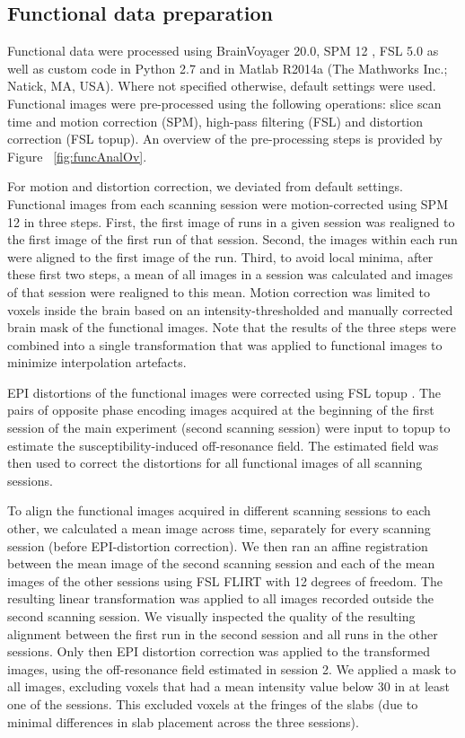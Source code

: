 \subsection{Functional data preparation}
Functional data were processed using BrainVoyager 20.0, SPM 12 \parencite{Friston2006}, FSL 5.0 \parencite{Jenkinson2012} as well as custom code in Python 2.7 \parencite{numpy2011, scipy2001, matplotlib2007} and in Matlab R2014a (The Mathworks Inc.; Natick, MA, USA). Where not specified otherwise, default settings were used. Functional images were pre-processed using the following operations: slice scan time and motion correction (SPM), high-pass filtering (FSL) and distortion correction (FSL topup). An overview of the pre-processing steps is provided by Figure ~\ref{fig:funcAnalOv}.

For motion and distortion correction, we deviated from default settings. Functional images from each scanning session were motion-corrected using SPM 12 in three steps. First, the first image of runs in a given session was realigned to the first image of the first run of that session. Second, the images within each run were aligned to the first image of the run. Third, to avoid local minima, after these first two steps, a mean of all images in a session was calculated and images of that session were realigned to this mean. Motion correction was limited to voxels inside the brain based on an intensity-thresholded and manually corrected brain mask of the functional images. Note that the results of the three steps were combined into a single transformation that was applied to functional images to minimize interpolation artefacts.

EPI distortions of the functional images were corrected using FSL topup \parencite{Andersson2003, Smith2004}. The pairs of opposite phase encoding images acquired at the beginning of the first session of the main experiment (second scanning session) were input to topup to estimate the susceptibility-induced off-resonance field. The estimated field was then used to correct the distortions for all functional images of all scanning sessions.

To align the functional images acquired in different scanning sessions to each other, we calculated a mean image across time, separately for every scanning session (before EPI-distortion correction). We then ran an affine registration between the mean image of the second scanning session and each of the mean images of the other sessions using FSL FLIRT \parencite{Jenkinson2001, Jenkinson2002} with 12 degrees of freedom. The resulting linear transformation was applied to all images recorded outside the second scanning session. We visually inspected the quality of the resulting alignment between the first run in the second session and all runs in the other sessions. Only then EPI distortion correction was applied to the transformed images, using the off-resonance field estimated in session 2. We applied a mask to all images, excluding voxels that had a mean intensity value below 30 in at least one of the sessions. This excluded voxels at the fringes of the slabs (due to minimal differences in slab placement across the three sessions).


